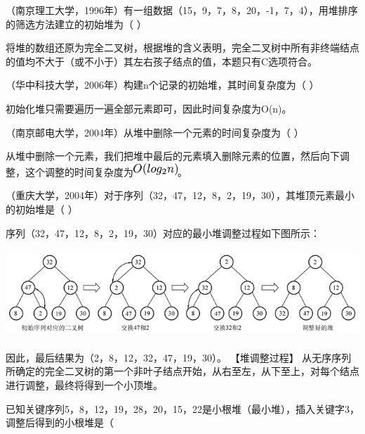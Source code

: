 \question （南京理工大学，1996年）有一组数据（15，9，7，8，20，-1，7，4），用堆排序的筛选方法建立的初始堆为（
）
\par{}
\begin{solution}将堆的数组还原为完全二叉树，根据堆的含义表明，完全二叉树中所有非终端结点的值均不大于（或不小于）其左右孩子结点的值，本题只有C选项符合。
\end{solution}
\question （华中科技大学，2006年）构建n个记录的初始堆，其时间复杂度为（ ）
\par\fourch{\textcolor{red}{}}{}{}{}
\begin{solution}初始化堆只需要遍历一遍全部元素即可，因此时间复杂度为O(n)。
\end{solution}
\question （南京邮电大学，2004年）从堆中删除一个元素的时间复杂度为（ ）
\par\fourch{}{\textcolor{red}{}}{}{}
\begin{solution}从堆中删除一个元素，我们把堆中最后的元素填入删除元素的位置，然后向下调整，这个调整的时间复杂度为\includegraphics[width=0.65625in,height=0.18750in]{texmath/39368f5Cdpi7B3507DO28log_2n29}。
\end{solution}
\question （重庆大学，2004年）对于序列（32，47，12，8，2，19，30），其堆顶元素最小的初始堆是（
）
\par{}
\begin{solution}序列（32，47，12，8，2，19，30）对应的最小堆调整过程如下图所示：
\includegraphics[width=7.07292in,height=1.59375in]{computerassets/960c7c52cb71db72b4c086f278de7ace.jpeg}
因此，最后结果为（2，8，12，32，47，19，30）。 【堆调整过程】
从无序序列所确定的完全二叉树的第一个非叶子结点开始，从右至左，从下至上，对每个结点进行调整，最终将得到一个小顶堆。
\end{solution}
\question 已知关键序列5，8，12，19，28，20，15，22是小根堆（最小堆），插入关键字3，调整后得到的小根堆是（
